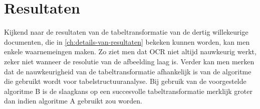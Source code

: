 
\chapter{Resultaten}
\label{ch:resultaten}

Kijkend naar de resultaten van de tabeltransformatie van de dertig willekeurige documenten, die in \ref{ch:details-van-resultaten} bekeken kunnen worden, kan men enkele waarnemeingen maken. Zo ziet men dat \Gls{OCR} niet altijd nauwkeurig werkt, zeker niet wanneer de resolutie van de afbeelding laag is. Verder kan men merken dat de nauwkeurigheid van de tabeltransformatie afhankelijk is van de algoritme die gebruikt wordt voor tabelstructuuranalyse. Bij gebruik van de voorgestelde algoritme B is de slaagkans op een succesvolle tabeltransformatie merklijk groter dan indien algoritme A gebruikt zou worden.
